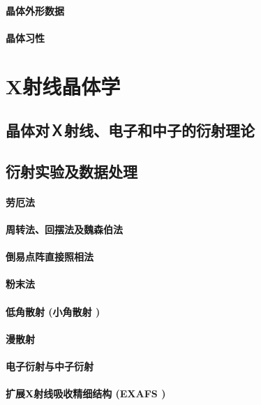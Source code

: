 \documentclass[UTF8]{../NatureUniverse}
\begin{document}
    \subsubsection{晶体外形数据}
    \subsubsection{晶体习性}






\chapter{X射线晶体学}
\section{晶体对Ｘ射线、电子和中子的衍射理论}
\section{衍射实验及数据处理}
    \subsubsection{劳厄法}
    \subsubsection{周转法、回摆法及魏森伯法}
    \subsubsection{倒易点阵直接照相法}
    \subsubsection{粉末法}
    \subsubsection{低角散射 (小角散射 )}
    \subsubsection{漫散射}
    \subsubsection{电子衍射与中子衍射}
    \subsubsection{扩展X射线吸收精细结构 (EXAFS )}
\end{document}
